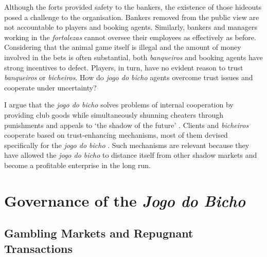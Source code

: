\documentclass[a4paper,12pt]{article}
\begin{document}
Although the forts provided safety to the bankers, the existence of those hideouts posed a challenge to the organisation. Bankers removed from the public view are not accountable to players and booking agents. Similarly, bankers and managers working in the \emph{fortalezas} cannot oversee their employees as effectively as before. Considering that the animal game itself is illegal and the amount of money involved in the bets is often substantial, both \emph{banqueiros} and booking agents have strong incentives to defect. Players, in turn, have no evident reason to trust \emph{banqueiros} or \emph{bicheiros}. How do \emph{jogo do bicho} agents overcome trust issues and cooperate under uncertainty?

I argue that the \emph{jogo do bicho} solves problems of internal cooperation by providing club goods \citep{buchanan1965economic, berman2008religion, berman2009radical, leeson2011government, roth2014prison} while simultaneously shunning cheaters through punishments and appeals to `the shadow of the future' \citep{axelrod1984evolution, axelrod1985achieving, bo2005cooperation, roth1978equilibrium}. Clients and \emph{bicheiros} cooperate based on trust-enhancing mechanisms, most of them devised specifically for the \emph{jogo do bicho} \citep{da1999aguias, magalhaes2005ganhou}. Such mechanisms are relevant because they have allowed the \emph{jogo do bicho} to distance itself from other shadow markets and become a profitable enterprise in the long run.

\section{Governance of the \emph{Jogo do Bicho}}
\label{sec:governance}

\subsection{Gambling Markets and Repugnant Transactions}
\label{sub:repugnance}
\end{document}

